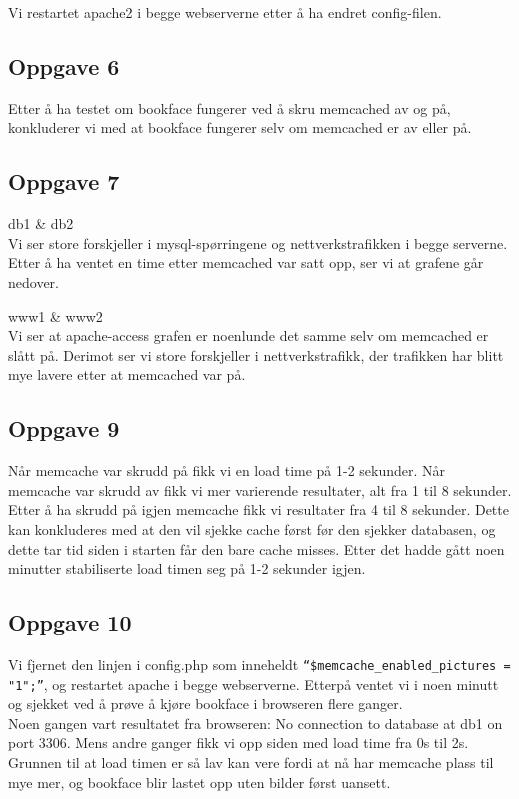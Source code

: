\documentclass[a4paper, norsk, 12pt]{article}
\begin{document}
Vi restartet apache2 i begge webserverne etter å ha endret config-filen.

\subsection{Oppgave 6}
Etter å ha testet om bookface fungerer ved å skru memcached av og på, konkluderer vi med at bookface fungerer selv om memcached er av eller på.

\subsection{Oppgave 7}
db1 \& db2
\\
Vi ser store forskjeller i mysql-spørringene og nettverkstrafikken i begge serverne. Etter å ha ventet en time etter memcached var satt opp, ser vi at grafene går nedover. 

www1 \& www2
\\
Vi ser at apache-access grafen er noenlunde det samme selv om memcached er slått på. Derimot ser vi store forskjeller i nettverkstrafikk, der trafikken har blitt mye lavere etter at memcached var på.

\subsection{Oppgave 9}
Når memcache var skrudd på fikk vi en load time på 1-2 sekunder.
Når memcache var skrudd av fikk vi mer varierende resultater, alt fra 1 til 8 sekunder.\\

Etter å ha skrudd på igjen memcache fikk vi resultater fra 4 til 8 sekunder. Dette kan konkluderes med at den vil sjekke cache først før den sjekker databasen, og dette tar tid siden i starten får den bare cache misses. Etter det hadde gått noen minutter stabiliserte load timen seg på 1-2 sekunder igjen.

\subsection{Oppgave 10}
Vi fjernet den linjen i config.php som inneheldt \verb|“$memcache_enabled_pictures = "1";”|, og restartet apache i begge webserverne. Etterpå ventet vi i noen minutt og sjekket ved å prøve å kjøre bookface i browseren flere ganger. \\

Noen gangen vart resultatet fra browseren: No connection to database at db1 on port 3306. Mens andre ganger fikk vi opp siden med load time fra 0s til 2s. Grunnen til at load timen er så lav kan vere fordi at nå har memcache plass til mye mer, og bookface blir lastet opp uten bilder først uansett.



%

\end{document}
